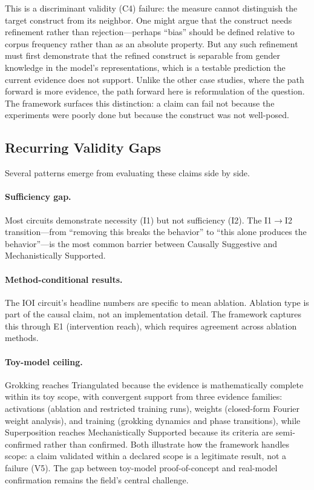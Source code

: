 \documentclass{article}
\begin{document}
This is a discriminant validity (C4) failure: the measure cannot distinguish the target construct from its neighbor. One might argue that the construct needs refinement rather than rejection---perhaps ``bias'' should be defined relative to corpus frequency rather than as an absolute property. But any such refinement must first demonstrate that the refined construct is separable from gender knowledge in the model's representations, which is a testable prediction the current evidence does not support. Unlike the other case studies, where the path forward is more evidence, the path forward here is reformulation of the question. The framework surfaces this distinction: a claim can fail not because the experiments were poorly done but because the construct was not well-posed.

\subsection{Recurring Validity Gaps}

Several patterns emerge from evaluating these claims side by side.

\paragraph{Sufficiency gap.} Most circuits demonstrate necessity (I1) but not sufficiency (I2). The I1$\rightarrow$I2 transition---from ``removing this breaks the behavior'' to ``this alone produces the behavior''---is the most common barrier between Causally Suggestive and Mechanistically Supported.

\paragraph{Method-conditional results.} The IOI circuit's headline numbers are specific to mean ablation. Ablation type is part of the causal claim, not an implementation detail. The framework captures this through E1 (intervention reach), which requires agreement across ablation methods.

\paragraph{Toy-model ceiling.} Grokking reaches Triangulated because the evidence is mathematically complete within its toy scope, with convergent support from three evidence families: activations (ablation and restricted training runs), weights (closed-form Fourier weight analysis), and training (grokking dynamics and phase transitions), while Superposition reaches Mechanistically Supported because its criteria are semi-confirmed rather than confirmed. Both illustrate how the framework handles scope: a claim validated within a declared scope is a legitimate result, not a failure (V5). The gap between toy-model proof-of-concept and real-model confirmation remains the field's central challenge.
\end{document}

